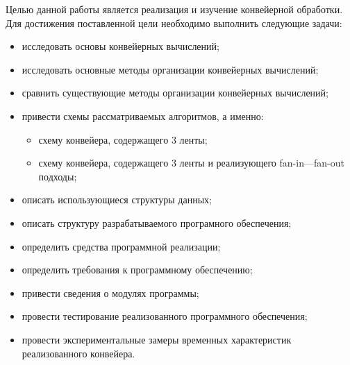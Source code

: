 Целью данной работы является реализация и изучение конвейерной обработки.
Для достижения поставленной цели необходимо выполнить следующие задачи:
\begin{itemize}
	\item исследовать основы конвейерных вычислений;
	\item исследовать основные методы организации конвейерных вычислений;
	\item сравнить существующие методы организации конвейерных вычислений;
	\item привести схемы рассматриваемых алгоритмов, а именно:
	\begin{itemize}
		\item схему конвейера, содержащего 3 ленты;
		\item схему конвейера, содержащего 3 ленты и реализующего fan-in---fan-out подходы;
	\end{itemize}
	\item описать использующиеся структуры данных;
	\item описать структуру разрабатываемого програмного обеспечения;
	\item определить средства программной реализации;
	\item определить требования к программному обеспечению;
	\item привести сведения о модулях программы;
	\item провести тестирование реализованного программного обеспечения;
	\item провести экспериментальные замеры временных характеристик реализованного конвейера.
\end{itemize}




